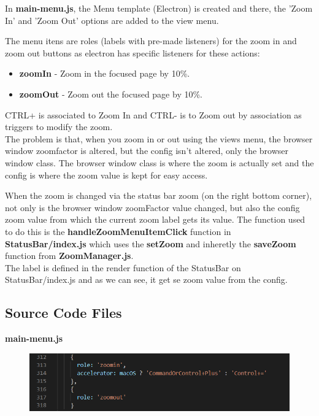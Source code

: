 \documentclass[main.tex]{subfiles}
\begin{document}
In \textbf{main-menu.js}, the Menu template (Electron) is created and there, the 'Zoom In' and 'Zoom Out' options are added to the view menu.

The menu itens are roles (labels with pre-made listeners) for the zoom in and zoom out buttons as electron has specific listeners for these actions:

\begin{itemize}
\item \textbf{zoomIn} - Zoom in the focused page by 10\%.
\item \textbf{zoomOut} - Zoom out the focused page by 10\%. 
\end{itemize}

CTRL+ is associated to Zoom In and CTRL- is to Zoom out by association as triggers to modify the zoom.\\

The problem is that, when you zoom in or out using the views menu, the browser window zoomfactor is altered, but the config isn't altered, only the browser window class. The browser window class is where the zoom is actually set and the config is where the zoom value is kept for easy access.

When the zoom is changed via the status bar zoom (on the right bottom corner), not only is the browser window zoomFactor value changed, but also the config zoom value from which the current zoom label gets its value. The function used to do this is the \textbf{handleZoomMenuItemClick} function in \textbf{StatusBar/index.js} which uses the \textbf{setZoom} and inheretly the \textbf{saveZoom} function from\textbf{ ZoomManager.js}.\\

The label is defined in the render function of the StatusBar on StatusBar/index.js and as we can see, it get se zoom value from the config.
\clearpage

\subsection{Source Code Files}

\textbf{main-menu.js}

\begin{figure}[h]
\includegraphics[scale=0.5]{images/mainMenu.png}
\centering
\end{figure}
\end{document}
